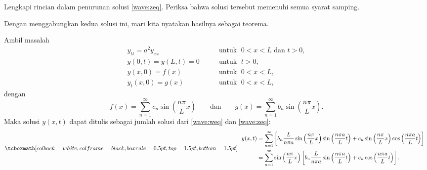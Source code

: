 \begin{exercise}
Lengkapi rincian dalam penurunan solusi \eqref{wave:zeq}.
Periksa bahwa solusi tersebut memenuhi semua syarat samping.
\end{exercise}

Dengan menggabungkan kedua solusi ini, mari kita nyatakan hasilnya sebagai teorema.
\begin{theorem}
Ambil masalah
\begin{equation} \label{wave:tyeq}
\begin{array}{ll}
y_{tt} = a^2 y_{xx} & \qquad \text{untuk } \; 0 < x < L \text{ dan } t > 0,  \\
y(0,t) = y(L,t) = 0 & \qquad \text{untuk } \; t > 0,  \\
y(x,0) = f(x) & \qquad \text{untuk } \; 0 < x < L , \\
y_t(x,0) = g(x) & \qquad \text{untuk } \; 0 < x < L ,
\end{array}
\end{equation}
dengan
\begin{equation*}
f(x) =
\sum_{n=1}^\infty c_n \sin \left( \frac{n \pi}{L} x \right)
\qquad \text{dan} \qquad
g(x) =
\sum_{n=1}^\infty b_n \sin \left( \frac{n \pi}{L} x \right) .
\end{equation*}
Maka solusi $y(x,t)$ dapat ditulis sebagai jumlah solusi
dari \eqref{wave:weq} dan \eqref{wave:zeq}:
\begin{equation*}
\mybxbg{~~
\begin{aligned}
y(x,t)
& =
\sum_{n=1}^\infty
\left[
b_n
\frac{L}{n \pi a}
\sin \left( \frac{n \pi}{L} x \right)
\sin \left( \frac{n \pi a}{L} t \right) 
+
c_n
\sin \left( \frac{n \pi}{L} x \right)
\cos \left( \frac{n \pi a}{L} t \right) 
\right]
\\
& =
\sum_{n=1}^\infty
\sin \left( \frac{n \pi}{L} x \right)
\left[
b_n
\frac{L}{n \pi a}
\sin \left( \frac{n \pi a}{L} t \right) 
+
c_n
\cos \left( \frac{n \pi a}{L} t \right) 
\right] .
\end{aligned}
~~}
\end{equation*}
\end{theorem}

